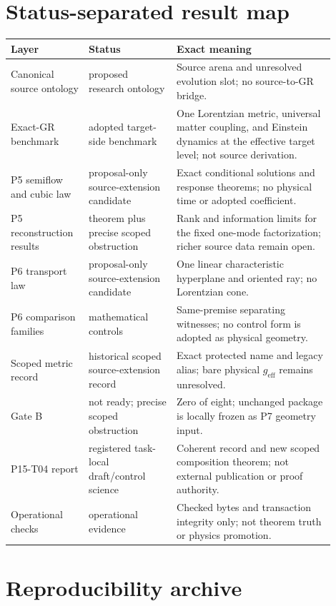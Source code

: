 \documentclass[11pt]{article}
\begin{document}
\section{Status-separated result map}

\begin{longtable}{p{0.20\linewidth}p{0.25\linewidth}p{0.45\linewidth}}
\toprule
Layer & Status & Exact meaning \\
\midrule
\endhead
Canonical source ontology & proposed research ontology & Source arena and unresolved evolution slot; no source-to-GR bridge. \\
Exact-GR benchmark & adopted target-side benchmark & One Lorentzian metric, universal matter coupling, and Einstein dynamics at the effective target level; not source derivation. \\
P5 semiflow and cubic law & proposal-only source-extension candidate & Exact conditional solutions and response theorems; no physical time or adopted coefficient. \\
P5 reconstruction results & theorem plus precise scoped obstruction & Rank and information limits for the fixed one-mode factorization; richer source data remain open. \\
P6 transport law & proposal-only source-extension candidate & One linear characteristic hyperplane and oriented ray; no Lorentzian cone. \\
P6 comparison families & mathematical controls & Same-premise separating witnesses; no control form is adopted as physical geometry. \\
Scoped metric record & historical scoped source-extension record & Exact protected name and legacy alias; bare physical \(g_{\mathrm{eff}}\) remains unresolved. \\
Gate B & not ready; precise scoped obstruction & Zero of eight; unchanged package is locally frozen as P7 geometry input. \\
P15-T04 report & registered task-local draft/control science & Coherent record and new scoped composition theorem; not external publication or proof authority. \\
Operational checks & operational evidence & Checked bytes and transaction integrity only; not theorem truth or physics promotion. \\
\bottomrule
\end{longtable}

\section{Reproducibility archive}
\end{document}
